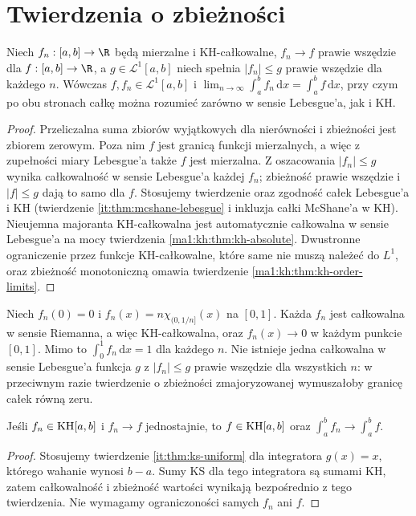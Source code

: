 \section{Twierdzenia o zbieżności}
\begin{twierdzenie}\label{ma1:kh:tw:hk-zbieznosc-dct}\label{tw:hk-zbieznosc-dct}
Niech $f_n:[a,b]\to\R$ będą mierzalne i KH-całkowalne, $f_n\to f$ prawie wszędzie dla $f:[a,b]\to\R$, a $g\in\mathcal L^1[a,b]$ niech spełnia $|f_n|\le g$ prawie wszędzie dla każdego $n$. Wówczas $f,f_n\in\mathcal L^1[a,b]$ i
$\lim_{n\to\infty}\int_a^bf_n\,\mathrm dx=\int_a^bf\,\mathrm dx$, przy czym po obu stronach całkę można rozumieć zarówno w sensie Lebesgue'a, jak i KH.
\end{twierdzenie}
\begin{proof}
Przeliczalna suma zbiorów wyjątkowych dla nierówności i zbieżności jest zbiorem zerowym. Poza nim $f$ jest granicą funkcji mierzalnych, a więc z zupełności miary Lebesgue'a także $f$ jest mierzalna. Z oszacowania $|f_n|\le g$ wynika całkowalność w sensie Lebesgue'a każdej $f_n$; zbieżność prawie wszędzie i $|f|\le g$ dają to samo dla $f$. Stosujemy twierdzenie  oraz zgodność całek Lebesgue'a i KH (twierdzenie \ref{it:thm:mcshane-lebesgue} i inkluzja całki McShane'a w KH). Nieujemna majoranta KH-całkowalna jest automatycznie
całkowalna w sensie Lebesgue'a na mocy twierdzenia
\ref{ma1:kh:thm:kh-absolute}. Dwustronne ograniczenie przez funkcje KH-całkowalne, które same nie muszą należeć do $L^1$, oraz zbieżność monotoniczną omawia twierdzenie \ref{ma1:kh:thm:kh-order-limits}.
\end{proof}
\begin{przyklad}
Niech $f_n(0)=0$ i $f_n(x)=n\chi_{(0,1/n]}(x)$ na $[0,1]$. Każda $f_n$ jest całkowalna w sensie Riemanna, a więc KH-całkowalna, oraz $f_n(x)\to0$ w każdym punkcie $[0,1]$. Mimo to $\int_0^1f_n\,\mathrm dx=1$ dla każdego $n$. Nie istnieje jedna całkowalna w sensie Lebesgue'a funkcja $g$ z $|f_n|\le g$ prawie wszędzie dla wszystkich $n$: w przeciwnym razie twierdzenie o zbieżności zmajoryzowanej wymuszałoby granicę całek równą zeru.
\end{przyklad}
\begin{stwierdzenie}\label{ma1:kh:st:hk-zbieznosc-jednostajna}\label{st:hk-zbieznosc-jednostajna}
Jeśli $f_n\in\mathrm{KH}[a,b]$ i $f_n\to f$ jednostajnie, to $f\in\mathrm{KH}[a,b]$ oraz $\int_a^bf_n\to\int_a^bf$.
\end{stwierdzenie}
\begin{proof}
Stosujemy twierdzenie \ref{it:thm:ks-uniform}
dla integratora $g(x)=x$, którego wahanie wynosi $b-a$.
Sumy KS dla tego integratora są sumami KH, zatem
całkowalność i zbieżność wartości wynikają bezpośrednio
z tego twierdzenia. Nie wymagamy ograniczoności samych
$f_n$ ani $f$.
\end{proof}


